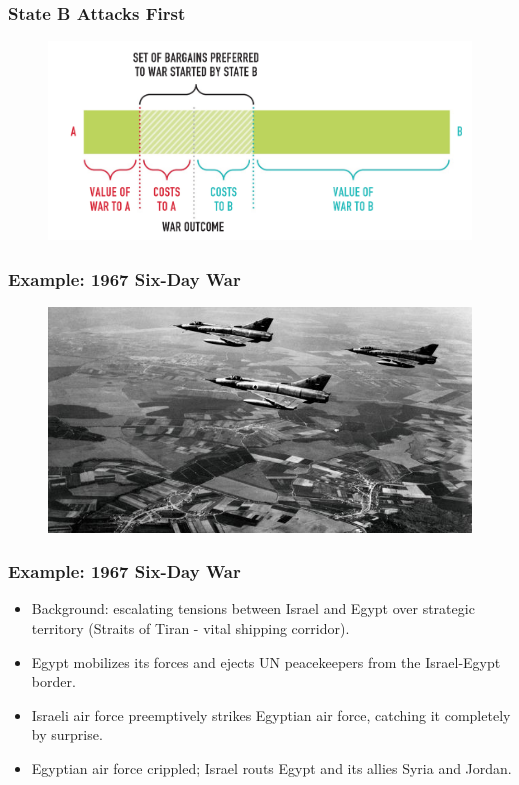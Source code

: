 \documentclass[handout]{beamer}
\begin{document}
\begin{frame} 
	\frametitle{\LARGE{State B Attacks First}}
	\begin{figure}[ht!]
		\centering
		\includegraphics[width=\textwidth,height=0.8\textheight,keepaspectratio]{./statebfirst.png}
	\end{figure}
\end{frame}

\begin{frame} 
	\frametitle{\LARGE{Example: 1967 Six-Day War}}
	\begin{figure}[ht!]
		\centering
		\includegraphics[width=\textwidth,height=0.8\textheight,keepaspectratio]{IsraelAF.jpg}
	\end{figure}
\end{frame}

\begin{frame} 
	\frametitle{\LARGE{Example: 1967 Six-Day War}}
	\begin{itemize}
		\item Background: escalating tensions between Israel and Egypt over strategic territory (Straits of Tiran - vital shipping corridor). \pause
		\item Egypt mobilizes its forces and ejects UN peacekeepers from the Israel-Egypt border. \pause
		\item Israeli air force preemptively strikes Egyptian air force, catching it completely by surprise. \pause
		\item Egyptian air force crippled; Israel routs Egypt and its allies Syria and Jordan.
	\end{itemize}
\end{frame}
\end{document}
